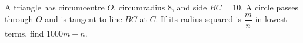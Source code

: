 A triangle has circumcentre $O$, circumradius 8, and side $BC=10$. A circle passes through $O$ and is tangent to line $BC$ at $C$. If its radius squared is $\dfrac{m}{n}$ in lowest terms, find $1000m+n$.
